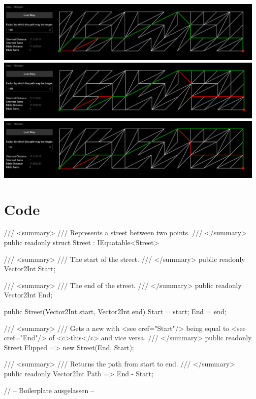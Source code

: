 \documentclass{article}
\theoremstyle{nonumberplain}
\begin{document}
\begin{center}
\includegraphics{examples/3_02.png}
\includegraphics{examples/3_04.png}
\includegraphics{examples/3_30.png}
\end{center}

\section{Code}

\begin{lstcs}[]
/// <summary>
/// Represents a street between two points.
/// </summary>
public readonly struct Street : IEquatable<Street>
{
    /// <summary>
    /// The start of the street.
    /// </summary>
    public readonly Vector2Int Start;

    /// <summary>
    /// The end of the street.
    /// </summary>
    public readonly Vector2Int End;

    public Street(Vector2Int start, Vector2Int end)
    {
        Start = start;
        End = end;
    }

    /// <summary>
    /// Gets a new with <see cref="Start"/> being equal to <see cref="End"/> of <c>this</c> and vice versa.
    /// </summary>
    public readonly Street Flipped => new Street(End, Start);

    /// <summary>
    /// Returns the path from start to end.
    /// </summary>
    public readonly Vector2Int Path => End - Start;

    // -- Boilerplate ausgelassen --
}
\end{lstcs}
\end{document}
